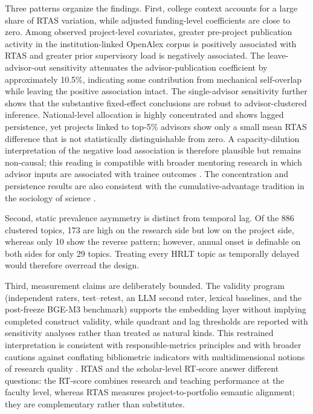\documentclass[11pt]{article}
\begin{document}
Three patterns organize the findings. First, college context accounts for a large share of RTAS variation, while adjusted funding-level coefficients are close to zero. Among observed project-level covariates, greater pre-project publication activity in the institution-linked OpenAlex corpus is positively associated with RTAS and greater prior supervisory load is negatively associated. The leave-advisor-out sensitivity attenuates the advisor-publication coefficient by approximately 10.5\%, indicating some contribution from mechanical self-overlap while leaving the positive association intact. The single-advisor sensitivity further shows that the substantive fixed-effect conclusions are robust to advisor-clustered inference. National-level allocation is highly concentrated and shows lagged persistence, yet projects linked to top-5\% advisors show only a small mean RTAS difference that is not statistically distinguishable from zero. A capacity-dilution interpretation of the negative load association is therefore plausible but remains non-causal; this reading is compatible with broader mentoring research in which advisor inputs are associated with trainee outcomes \citep{paglis2006adviser}. The concentration and persistence results are also consistent with the cumulative-advantage tradition in the sociology of science \citep{merton1968matthew,merton1988matthewii,allison1982cumulative,diprete2006cumulative}.

Second, static prevalence asymmetry is distinct from temporal lag. Of the 886 clustered topics, 173 are high on the research side but low on the project side, whereas only 10 show the reverse pattern; however, annual onset is definable on both sides for only 29 topics. Treating every HRLT topic as temporally delayed would therefore overread the design.

Third, measurement claims are deliberately bounded. The validity program (independent raters, test--retest, an LLM second rater, lexical baselines, and the post-freeze BGE-M3 benchmark) supports the embedding layer without implying completed construct validity, while quadrant and lag thresholds are reported with sensitivity analyses rather than treated as natural kinds. This restrained interpretation is consistent with responsible-metrics principles and with broader cautions against conflating bibliometric indicators with multidimensional notions of research quality \citep{hicks2015leiden,aksnes2019citations}. RTAS and the scholar-level RT-score answer different questions: the RT-score combines research and teaching performance at the faculty level, whereas RTAS measures project-to-portfolio semantic alignment; they are complementary rather than substitutes.
\end{document}
